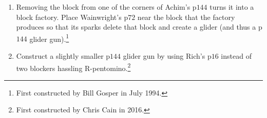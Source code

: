 \begin{multicols}{2}
\begin{problem}
		\begin{enumerate}[label=\bf\color{ocre}(\alph*)]
			\item Removing the block from one of the corners of Achim's p$144$ turns it into a block factory. Place Wainwright's p$72$ near the block that the factory produces so that its sparks delete that block and create a glider (and thus a p$144$ glider gun).\footnote{First constructed by Bill Gosper in July 1994.}
			
			\item Construct a slightly smaller p$144$ glider gun by using Rich's p$16$ instead of two blockers hassling R-pentomino.\footnote{First constructed by Chris Cain in 2016.}
		\end{enumerate}
	\end{problem}
	
	
	
	

\end{multicols}
